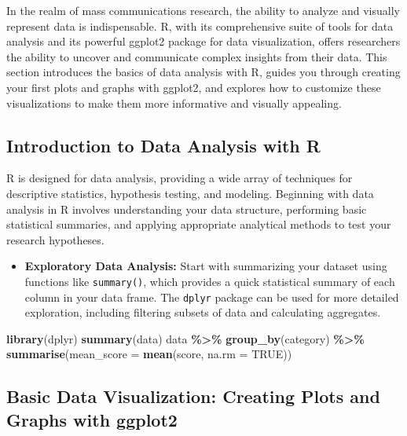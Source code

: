\documentclass[
]{book}
\newenvironment{Shaded}{\begin{snugshade}}{\end{snugshade}}
\newcommand{\AttributeTok}[1]{\textcolor[rgb]{0.13,0.29,0.53}{#1}}
\newcommand{\ConstantTok}[1]{\textcolor[rgb]{0.56,0.35,0.01}{#1}}
\newcommand{\FunctionTok}[1]{\textcolor[rgb]{0.13,0.29,0.53}{\textbf{#1}}}
\newcommand{\NormalTok}[1]{#1}
\newcommand{\SpecialCharTok}[1]{\textcolor[rgb]{0.81,0.36,0.00}{\textbf{#1}}}
\providecommand{\tightlist}{%
  \setlength{\itemsep}{0pt}\setlength{\parskip}{0pt}}
\begin{document}
In the realm of mass communications research, the ability to analyze and visually represent data is indispensable. R, with its comprehensive suite of tools for data analysis and its powerful ggplot2 package for data visualization, offers researchers the ability to uncover and communicate complex insights from their data. This section introduces the basics of data analysis with R, guides you through creating your first plots and graphs with ggplot2, and explores how to customize these visualizations to make them more informative and visually appealing.

\hypertarget{introduction-to-data-analysis-with-r}{%
\subsection*{Introduction to Data Analysis with R}\label{introduction-to-data-analysis-with-r}}

R is designed for data analysis, providing a wide array of techniques for descriptive statistics, hypothesis testing, and modeling. Beginning with data analysis in R involves understanding your data structure, performing basic statistical summaries, and applying appropriate analytical methods to test your research hypotheses.

\begin{itemize}
\tightlist
\item
  \textbf{Exploratory Data Analysis:} Start with summarizing your dataset using functions like \texttt{summary()}, which provides a quick statistical summary of each column in your data frame. The \texttt{dplyr} package can be used for more detailed exploration, including filtering subsets of data and calculating aggregates.
\end{itemize}

\begin{Shaded}
\begin{Highlighting}[]
\FunctionTok{library}\NormalTok{(dplyr)}
\FunctionTok{summary}\NormalTok{(data)}
\NormalTok{data }\SpecialCharTok{\%\textgreater{}\%} 
  \FunctionTok{group\_by}\NormalTok{(category) }\SpecialCharTok{\%\textgreater{}\%} 
  \FunctionTok{summarise}\NormalTok{(}\AttributeTok{mean\_score =} \FunctionTok{mean}\NormalTok{(score, }\AttributeTok{na.rm =} \ConstantTok{TRUE}\NormalTok{))}
\end{Highlighting}
\end{Shaded}

\hypertarget{basic-data-visualization-creating-plots-and-graphs-with-ggplot2}{%
\subsection*{Basic Data Visualization: Creating Plots and Graphs with ggplot2}\label{basic-data-visualization-creating-plots-and-graphs-with-ggplot2}}
\end{document}
